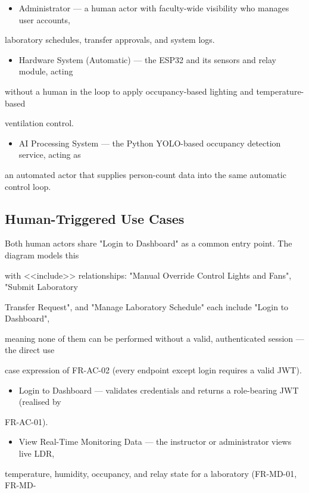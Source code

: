 \begin{itemize}
	\item Administrator --- a human actor with faculty-wide visibility who manages user accounts,
\end{itemize}
laboratory schedules, transfer approvals, and system logs.

\begin{itemize}
	\item Hardware System (Automatic) --- the ESP32 and its sensors and relay module, acting
\end{itemize}
without a human in the loop to apply occupancy-based lighting and temperature-based

ventilation control.

\begin{itemize}
	\item AI Processing System --- the Python YOLO-based occupancy detection service, acting as
\end{itemize}
an automated actor that supplies person-count data into the same automatic control loop.


\subsection{Human-Triggered Use Cases}
Both human actors share "Login to Dashboard" as a common entry point. The diagram models this

with <<include>> relationships: "Manual Override Control Lights and Fans", "Submit Laboratory

Transfer Request", and "Manage Laboratory Schedule" each include "Login to Dashboard",

meaning none of them can be performed without a valid, authenticated session --- the direct use

case expression of FR-AC-02 (every endpoint except login requires a valid JWT).

\begin{itemize}
	\item Login to Dashboard --- validates credentials and returns a role-bearing JWT (realised by
\end{itemize}
FR-AC-01).

\begin{itemize}
	\item View Real-Time Monitoring Data --- the instructor or administrator views live LDR,
\end{itemize}
temperature, humidity, occupancy, and relay state for a laboratory (FR-MD-01, FR-MD-

